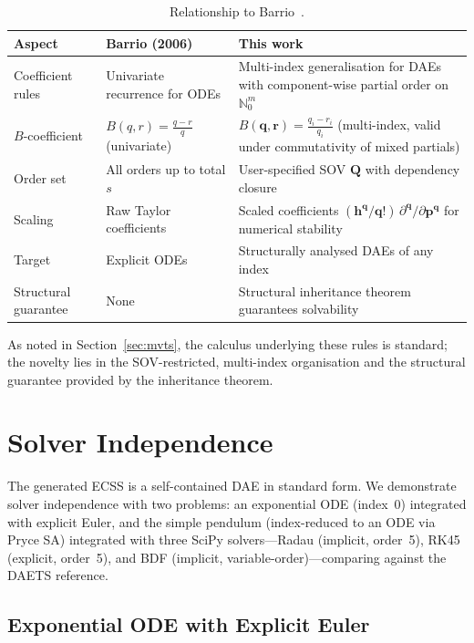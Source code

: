 \documentclass[12pt,a4paper]{article}
\theoremstyle{definition}
\theoremstyle{plain}
\theoremstyle{remark}
\newcommand{\vp}{\mathbf{p}}
\newcommand{\vq}{\mathbf{q}}
\newcommand{\vQ}{\mathbf{Q}}
\newcommand{\vr}{\mathbf{r}}
\newcommand{\vh}{\mathbf{h}}
\begin{document}
\begin{table}[htbp]
  \centering
  \caption{Relationship to Barrio~\cite{barrio2006sensitivity}.}
  \label{tab:barrio}
  \small
  \begin{tabular}{>{\raggedright\arraybackslash}p{2.4cm}>{\raggedright\arraybackslash}p{4.0cm}>{\raggedright\arraybackslash}p{4.2cm}}
    \toprule
    Aspect & Barrio (2006) & This work \\
    \midrule
    Coefficient rules & Univariate recurrence for ODEs & Multi-index generalisation for DAEs with component-wise partial order on $\mathbb{N}_0^m$ \\
    $B$-coefficient & $B(q,r)=\frac{q-r}{q}$ (univariate) & $B(\vq,\vr)=\frac{q_i-r_i}{q_i}$ (multi-index, valid under commutativity of mixed partials) \\
    Order set & All orders up to total $s$ & User-specified SOV $\vQ$ with dependency closure \\
    Scaling & Raw Taylor coefficients & Scaled coefficients $(\vh^{\vq}/\vq!)\,\partial^{\vq}/\partial\vp^{\vq}$ for numerical stability \\
    Target & Explicit ODEs & Structurally analysed DAEs of any index \\
    Structural guarantee & None & Structural inheritance theorem guarantees solvability \\
    \bottomrule
  \end{tabular}
\end{table}

\noindent As noted in Section~\ref{sec:mvts}, the calculus underlying these rules is standard; the novelty lies in the SOV-restricted, multi-index organisation and the structural guarantee provided by the inheritance theorem.

\section{Solver Independence}
\label{sec:solver}

The generated ECSS is a self-contained DAE in standard form. We demonstrate solver independence with two problems: an exponential ODE (index~0) integrated with explicit Euler, and the simple pendulum (index-reduced to an ODE via Pryce SA) integrated with three SciPy solvers---Radau (implicit, order~5), RK45 (explicit, order~5), and BDF (implicit, variable-order)---comparing against the DAETS reference.

\subsection{Exponential ODE with Explicit Euler}
\end{document}
